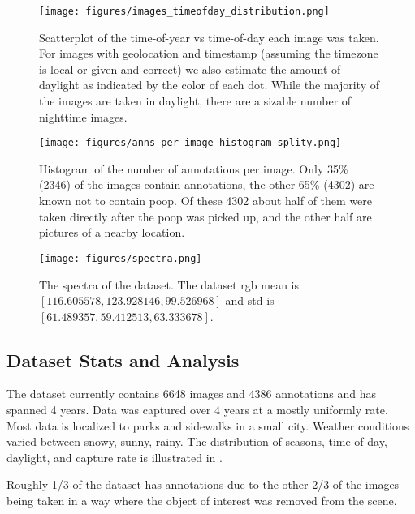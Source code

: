 \documentclass[10pt,twocolumn,letterpaper]{article}
\begin{document}
\begin{figure}[h]
\centering
\texttt{[image: figures/images\_timeofday\_distribution.png]}
\caption[]{
    Scatterplot of the time-of-year vs time-of-day each image was taken.  For
    images with geolocation and timestamp (assuming the timezone is local or
    given and correct) we also estimate the amount of daylight as indicated by
    the color of each dot. While the majority of the images are taken in
    daylight, there are a sizable number of nighttime images.
}
\label{fig:TimeOfDayDistribution}
\end{figure}


\begin{figure}[h]
\centering
\texttt{[image: figures/anns\_per\_image\_histogram\_splity.png]}
\caption[]{
    Histogram of the number of annotations per image. 
    Only 35\% (2346) of the images contain annotations, the other 65\% (4302)
    are known not to contain poop. Of these 4302 about half of them were taken
    directly after the poop was picked up, and the other half are pictures of a
    nearby location.
}
\label{fig:AnnotsPerImage}
\end{figure}


\begin{figure}[h]
\centering
\texttt{[image: figures/spectra.png]}
\caption[]{
    The spectra of the dataset.
    The dataset rgb  mean is $[116.605578, 123.928146, 99.526968]$ and std is
    $[61.489357, 59.412513, 63.333678]$.
}
\label{fig:spectra}
\end{figure}

\subsection{Dataset Stats and Analysis}


The dataset currently contains 6648 images and 4386 annotations and has spanned
4 years. Data was captured over 4 years at a mostly uniformly rate.  Most data
is localized to parks and sidewalks in a small city.  Weather conditions varied
between snowy, sunny, rainy.  The distribution of seasons, time-of-day,
daylight, and capture rate is illustrated in .

Roughly 1/3 of the dataset has annotations due to the other 2/3 of the
images being taken in a way where the object of interest was removed from the
scene.
\end{document}

